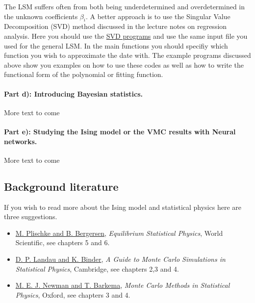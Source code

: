 \documentclass[%
oneside,                 %
final,                   %
10pt]{article}
\begin{document}
The LSM suffers often from both being underdetermined and overdetermined in the unknown coefficients $\beta_i$.  A better approach is to use the Singular Value Decomposition (SVD) method discussed in the lecture notes on regression analysis. Here you should use the \href{{https://github.com/CompPhysics/MachineLearning/tree/master/doc/Programs/SVD}}{SVD programs} and use the same input file you used for the general LSM. In the main functions you should specifiy which function you wish to approximate the date with. The example programs discussed above show you examples on how to use these codes as well as how to write the functional form of the polynomial or fitting function. 


\paragraph{Part d): Introducing Bayesian statistics.}
More text to come

\paragraph{Part e): Studying the Ising model or the VMC results with Neural networks.}
More text to come

\subsection*{Background literature}

If you wish to read more about the Ising model and statistical physics here are three suggestions.

\begin{itemize}
  \item \href{{http://www.worldscientific.com/worldscibooks/10.1142/5660}}{M. Plischke and B. Bergersen}, \emph{Equilibrium Statistical Physics}, World Scientific, see chapters 5 and 6.

  \item \href{{http://www.cambridge.org/no/academic/subjects/physics/computational-science-and-modelling/guide-monte-carlo-simulations-statistical-physics-4th-edition?format=HB}}{D. P. Landau and K. Binder}, \emph{A Guide to Monte Carlo Simulations in Statistical Physics}, Cambridge, see chapters 2,3 and 4.

  \item \href{{https://global.oup.com/academic/product/monte-carlo-methods-in-statistical-physics-9780198517979?cc=no&lang=en&}}{M. E. J. Newman and T. Barkema}, \emph{Monte Carlo Methods in Statistical Physics}, Oxford, see chapters 3 and 4.
\end{itemize}
\end{document}

